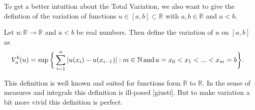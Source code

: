     To get a better intuition about the Total Variation, we also want to give the defintion of the variation of functions $u \in [a, b] \subset \mathbb{R}$ with $a, b \in \mathbb{R}$ and $a < b$.

    \begin{definition} %
    \label{def:variation_of_a_function}

        Let $u: \mathbb{R} \longrightarrow \mathbb{R}$ and $a < b$ be real numbers. Then define the variation of $u$ on $[a, b]$ as
            $$
                V^{b}_{a}(u) = \sup \bigg\{ \sum_{i = 1}^{n} |u(x_{i}) - u(x_{i - 1})| : m \in \mathbb{N} \,\textnormal{and}\, a = x_{0} < x_{1} < ... < x_{m} = b \bigg\}.
            $$

    \end{definition}

    This definition is well known and suited for functions form $\mathbb{R}$ to $\mathbb{R}$. In the sense of measures and integrals this definition is ill-posed [giusti]. But to make variation a bit more vivid this definition is perfect.

